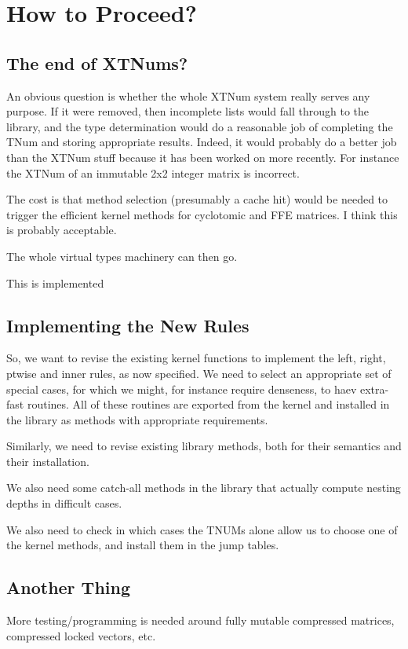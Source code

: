 \documentclass{article}
\begin{document}
\section{How to Proceed?}

\subsection{The end of XTNums?}

An obvious question is whether the whole XTNum system really serves
any purpose.  If it were removed, then incomplete lists would fall
through to the library, and the type determination would do a
reasonable job of completing the TNum and storing appropriate
results. Indeed, it would probably do a better job than the XTNum
stuff because it has been worked on more recently. For instance the
XTNum of an immutable 2x2 integer matrix is incorrect. 

The cost is that method selection (presumably a cache hit) would be
needed to trigger the efficient kernel methods for cyclotomic and FFE
matrices. I think this is probably acceptable.

The whole virtual types machinery can then go.

This is implemented

\subsection{Implementing the New Rules}

So, we want to revise the existing kernel functions to implement the
left, right, ptwise and inner rules, as now specified. We need to
select an appropriate set of special cases, for which we might, for
instance require denseness, to haev extra-fast routines. All of these
routines are exported from the kernel and installed in the library as
methods with appropriate requirements. 

Similarly, we need to revise existing library methods, both for their
semantics and their installation.

We also need some catch-all methods in the library that actually
compute nesting depths in difficult cases. 

We also need to check in which cases the TNUMs alone allow us to
choose one of the kernel methods, and install them in the jump tables.


\subsection{Another Thing}

More testing/programming is needed around fully mutable compressed
matrices, compressed locked vectors, etc.
\end{document}
